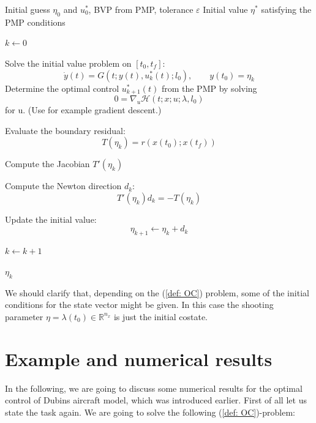 \documentclass[a4paper]{article}
\theoremstyle{definitions}
\theoremstyle{bemerkung}
\theoremstyle{satz}
\theoremstyle{satz}
\begin{document}
    \begin{algorithm}[h!]
        \caption{Single Shooting for Optimal Control Problems (PMP)}
        \label{alg:single-shooting-pmp}
        \begin{algorithmic}[1]
            \Require Initial guess $\eta_0$ and $u^*_0$, BVP from PMP, tolerance $\varepsilon$
            \Ensure Initial value $\eta^*$ satisfying the PMP conditions

            \State $k \gets 0$

                \State Solve the initial value problem on $[t_0,t_f]$:
                \[
                    \dot{y}(t) = G(t;y(t),u^*_k(t);l_0),
                    \qquad y(t_0)=\eta_k
                \]
                \State Determine the optimal control $u^*_{k+1}(t)$ from the PMP by solving
                \[0 = \nabla_u \mathcal{H}(t;x;u;\lambda, l_0)\] for u. (Use for example gradient descent.)

                \State Evaluate the boundary residual:
                \[
                    T(\eta_k) = r(x(t_0);x(t_f))
                \]

                \State Compute the Jacobian $T'(\eta_k)$

                \State Compute the Newton direction $d_k$:
                \[
                    T'(\eta_k)d_k=-T(\eta_k)
                \]

                \State Update the initial value:
                \[
                    \eta_{k+1} \gets \eta_k+d_k
                \]

                \State $k \gets k+1$
            \EndWhile

            \State \Return $\eta_k$
        \end{algorithmic}
    \end{algorithm}

    We should clarify that, depending on the (\ref{def: OC}) problem, some of the initial conditions for the state vector might be given. In this case the shooting parameter $\eta = \lambda(t_0) \in \mathbb{R}^{n_x}$ is just the initial costate.


\section{Example and numerical results}
    In the following, we are going to discuss some numerical results for the optimal control of Dubins aircraft model, which was introduced earlier. First of all let us state the task again. We are going to solve the following (\ref{def: OC})-problem:
\end{document}
